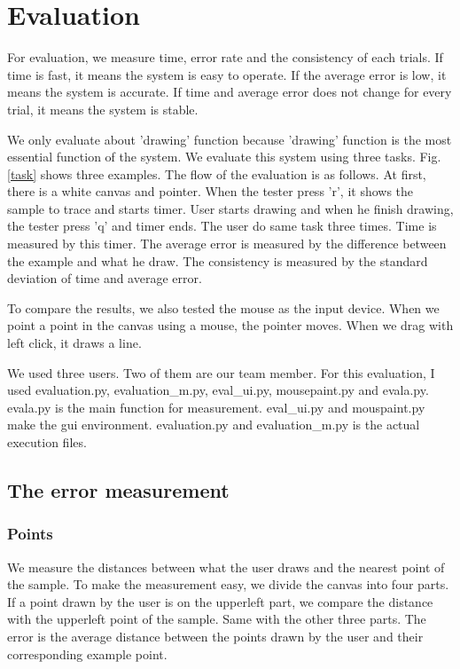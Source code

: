 \clearpage
\section{Evaluation}
For evaluation, we measure time, error rate and the consistency of each trials.
If time is fast, it means the system is easy to operate.
If the average error is low, it means the system is accurate.
If time and average error does not change for every trial, it means the system is stable.
\par
We only evaluate about 'drawing' function because 'drawing' function is the most essential function of the system.
We evaluate this system using three tasks. Fig. \ref{task} shows three examples.
The flow of the evaluation is as follows. At first, there is a white canvas and pointer.
When the tester press 'r', it shows the sample to trace and starts timer.
User starts drawing and when he finish drawing, the tester press 'q' and timer ends.
The user do same task three times.
Time is measured by this timer. The average error is measured by the difference between the example and what he draw. The consistency is measured by the standard deviation of time and average error.
\par
To compare the results, we also tested the mouse as the input device. When we point a point in the canvas using a mouse, the pointer moves. When we drag with left click, it draws a line.\par
We used three users. Two of them are our team member.
For this evaluation, I used evaluation.py, evaluation\_m.py, eval\_ui.py, mousepaint.py and evala.py.
evala.py is the main function for measurement. eval\_ui.py and mouspaint.py make the gui environment. evaluation.py and evaluation\_m.py is the actual execution files.
\subsection{The error measurement}
\subsubsection{Points}
We measure the distances between what the user draws and the nearest point of the sample.
To make the measurement easy, we divide the canvas into four parts.
If a point drawn by the user is on the upperleft part, we compare the distance with the upperleft point of the sample. Same with the other three parts. The error is the average distance between the points drawn by the user and their corresponding example point. 
